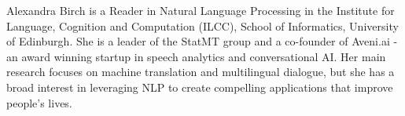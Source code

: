 Alexandra Birch is a Reader in Natural Language Processing in the Institute for Language, Cognition and Computation (ILCC), School of Informatics, University of Edinburgh. She is a leader of the StatMT group and a co-founder of Aveni.ai - an award winning startup in speech analytics and conversational AI. Her main research focuses on machine translation and multilingual dialogue, but she has a broad interest in leveraging NLP to create compelling applications that improve people's lives.
